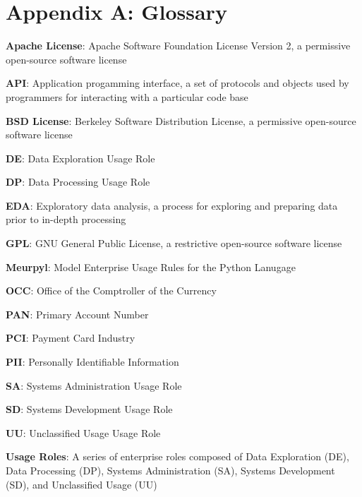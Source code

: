 \newcommand{\definition}[2]{
	\textbf{#1}: #2
}

\section{Appendix A: Glossary}

\thispagestyle{section_start_style}

    \definition{Apache License}{Apache Software Foundation License Version 2, a permissive open-source software license}

    \definition{API}{Application progamming interface, a set of protocols and objects used by programmers for interacting with a particular code base}

    \definition{BSD License}{Berkeley Software Distribution License, a permissive open-source software license}

	\definition{DE}{Data Exploration Usage Role}

	\definition{DP}{Data Processing Usage Role}

	\definition{EDA}{Exploratory data analysis, a process for exploring and preparing data prior to in-depth processing}

    \definition{GPL}{GNU General Public License, a restrictive open-source software license}

	\definition{Meurpyl}{Model Enterprise Usage Rules for the Python Lanugage}

	\definition{OCC}{Office of the Comptroller of the Currency}

	\definition{PAN}{Primary Account Number}

	\definition{PCI}{Payment Card Industry}

	\definition{PII}{Personally Identifiable Information}

	\definition{SA}{Systems Administration Usage Role}

	\definition{SD}{Systems Development Usage Role}

	\definition{UU}{Unclassified Usage Usage Role}

	\definition{Usage Roles}{A series of enterprise roles composed of Data Exploration (DE), Data Processing (DP), Systems Administration (SA), Systems Development (SD), and Unclassified Usage (UU)}

\setlength{\parskip}{1em}
